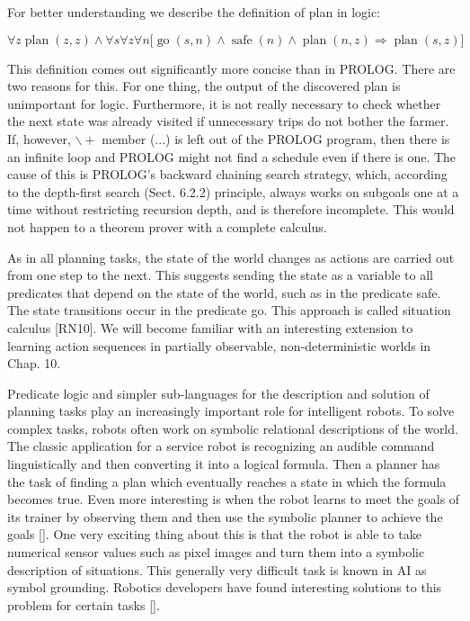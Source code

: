 \documentclass[10pt]{book}
\begin{document}
For better understanding we describe the definition of plan in logic:

$$
\forall z \operatorname{plan}(z, z) \wedge \forall s \forall z \forall n \bigl[ \operatorname{go}(s, n) \wedge \operatorname{safe}(n) \wedge \operatorname{plan}(n, z) \Rightarrow \operatorname{plan}(s, z) \bigr]
$$

This definition comes out significantly more concise than in PROLOG. There are two reasons for this. For one thing, the output of the discovered plan is unimportant for logic. Furthermore, it is not really necessary to check whether the next state was already visited if unnecessary trips do not bother the farmer. If, however, $\backslash+$ member (...) is left out of the PROLOG program, then there is an infinite loop and PROLOG might not find a schedule even if there is one. The cause of this is PROLOG's backward chaining search strategy, which, according to the depth-first search (Sect. 6.2.2) principle, always works on subgoals one at a time without restricting recursion depth, and is therefore incomplete. This would not happen to a theorem prover with a complete calculus.

As in all planning tasks, the state of the world changes as actions are carried out from one step to the next. This suggests sending the state as a variable to all predicates that depend on the state of the world, such as in the predicate safe. The state transitions occur in the predicate go. This approach is called situation calculus [RN10]. We will become familiar with an interesting extension to learning action sequences in partially observable, non-deterministic worlds in Chap. 10.

Predicate logic and simpler sub-languages for the description and solution of planning tasks play an increasingly important role for intelligent robots. To solve complex tasks, robots often work on symbolic relational descriptions of the world. The classic application for a service robot is recognizing an audible command linguistically and then converting it into a logical formula. Then a planner has the task of finding a plan which eventually reaches a state in which the formula becomes true. Even more interesting is when the robot learns to meet the goals of its trainer by observing them and then use the symbolic planner to achieve the goals [\cite{cubek2015hllfd}]. One very exciting thing about this is that the robot is able to take numerical sensor values such as pixel images and turn them into a symbolic description of situations. This generally very difficult task is known in AI as symbol grounding. Robotics developers have found interesting solutions to this problem for certain tasks [\cite{cubek2015symbolgrounding}].
\end{document}
